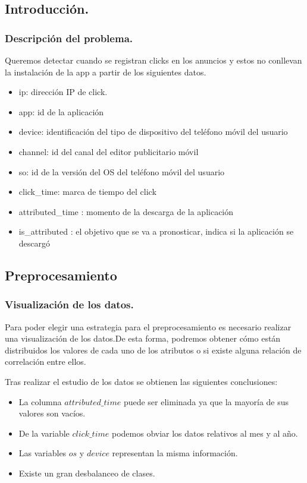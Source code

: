 \documentclass{beamer}
\theoremstyle{plain}
\theoremstyle{definition}
\theoremstyle{plain}
\theoremstyle{definition}
\theoremstyle{remark}
\theoremstyle{definition}
\begin{document}
\subsection{Introducción.}
\begin{frame}
\end{frame}
\begin{frame}
	\frametitle{Descripción del problema.}
	Queremos detectar cuando se registran clicks en los anuncios y estos no conllevan la instalación de la app a partir de los siguientes datos.
\begin{itemize}
	
	\item ip: dirección IP de click.
	\item app: id de la aplicación
	\item device: identificación del tipo de dispositivo del teléfono móvil del usuario
	\item channel: id del canal del editor publicitario móvil
	\item so: id de la versión del OS del teléfono móvil del usuario
	\item click\_time: marca de tiempo del click 
	\item attributed\_time : momento de la descarga de la aplicación 
	\item is\_attributed : el objetivo que se va a pronosticar, indica si la aplicación se descargó
\end{itemize}
\end{frame}
\subsection{Preprocesamiento}
\begin{frame}
\end{frame}
\begin{frame}
	\frametitle{Visualización de los datos.}
	Para poder elegir una estrategia para el preprocesamiento es necesario
	realizar una visualización de los datos.De esta forma, podremos obtener
	cómo están distribuidos los valores de cada uno de los atributos o si existe alguna relación de correlación entre ellos.
	\medskip
	
	Tras realizar el estudio de los datos se obtienen las siguientes conclusiones:
		\begin{itemize}
		\item La columna $attributed\_time$ puede ser eliminada ya que la mayoría de sus valores son vacíos.
		\item De la variable $click\_time$ podemos obviar los datos relativos al mes y al año.
		\item Las variables $os$ y $device$ representan la misma información.
		\item Existe un gran desbalanceo de clases.
	\end{itemize}
\end{frame}
\end{document}
